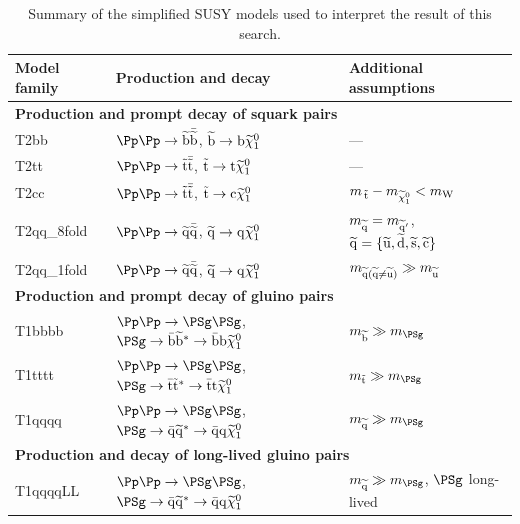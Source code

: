 \begin{table}%
	\centering
	\begin{tabular}{ lll }
		\hline
		Model family
		& Production and decay
		& Additional 
		assumptions                 \\
		\hline
		\multicolumn{3}{l}{\textbf{Production and prompt decay of squark 
		pairs}}           \\
		T2bb
		& $\Pp\Pp \to \sbottom\asbottom$,
		$\mathrm{\widetilde{b}} \to \mathrm{b}\widetilde{\chi}_1^0$
		& 
		---                   \\
		T2tt
		& $\Pp\Pp \to \stopp\astop$,
		$\mathrm{\tilde{t}} \to \mathrm{t}\widetilde{\chi}_1^0$
		& 
		---                      \\
		T2cc
		& $\Pp\Pp \to \stopp\astop$,
		$\mathrm{\tilde{t}} \to \mathrm{c}\widetilde{\chi}_1^0$
		& $m_{\,\mathrm{\tilde{t}}} - m_{\widetilde{\chi}_1^0} < m_\mathrm{W}$      \\
		T2qq\_8fold
		& $\Pp\Pp \to \squark\asquark$,
		$\mathrm{\widetilde{q}} \to \mathrm{q}\widetilde{\chi}_1^0$
		& $m_{\mathrm{\widetilde{q}}} = m_{\mathrm{\widetilde{q}}'}$,
		$\mathrm{\widetilde{q}} = \{ \mathrm{\widetilde{u}}, \mathrm{\widetilde{d}}, \mathrm{\widetilde{s}}, \mathrm{\widetilde{c}} \}$       \\
		T2qq\_1fold
		& $\Pp\Pp \to \squark\asquark$,
		$\mathrm{\widetilde{q}} \to \mathrm{q}\widetilde{\chi}_1^0$
		& $m_{\mathrm{\widetilde{q}} (\mathrm{\widetilde{q}} \neq \mathrm{\widetilde{u}})} \gg m_{\mathrm{\widetilde{u}}}$ \\
		\multicolumn{3}{l}{\textbf{Production and prompt decay of gluino 
		pairs}}           \\
		T1bbbb
		& $\Pp\Pp \to \PSg\PSg$,
		$\PSg\to \bar{\mathrm{b}}\sbottom^* \to 
		\bar{\mathrm{b}}\mathrm{b}\neutralino$
		& $m_{\sbottom} \gg m_{\PSg}$              \\
		T1tttt
		& $\Pp\Pp \to \PSg\PSg$,
		$\PSg\to \bar{\mathrm{t}}\stopp^* \to 
		\bar{\mathrm{t}}\mathrm{t}\neutralino$
		& $m_{\stopp} \gg m_{\PSg}$           	\\                         
		T1qqqq
		& $\Pp\Pp \to \PSg\PSg$,
		$\PSg\to \bar{\mathrm{q}}\squark^* \to 
		\bar{\mathrm{q}}\mathrm{q}\neutralino$
		& $m_{\squark} \gg m_{\PSg}$      \\                           
		\multicolumn{3}{l}{\textbf{Production and decay of long-lived gluino 
		pairs}}       \\
		T1qqqqLL
		& $\Pp\Pp \to \PSg\PSg$,
		$\PSg\to \bar{\mathrm{q}}\squark^* \to
		\bar{\mathrm{q}}\mathrm{q}\neutralino$
		& $m_{\squark} \gg m_{\PSg}$, $\PSg$ long-lived    \\
		\hline
	\end{tabular}
\caption{Summary of the simplified SUSY models used to interpret the result of 
this search.} 
\label{tab:sms}
\end{table}

